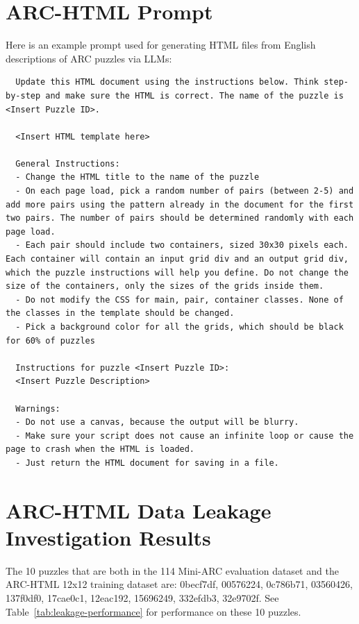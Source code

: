 \documentclass[10pt,twocolumn]{article}
\begin{document}
\section{ARC-HTML Prompt}
Here is an example prompt used for generating HTML files from English
descriptions of ARC puzzles via LLMs:

\begin{lstlisting}
  Update this HTML document using the instructions below. Think step-by-step and make sure the HTML is correct. The name of the puzzle is <Insert Puzzle ID>.

  <Insert HTML template here>

  General Instructions:
  - Change the HTML title to the name of the puzzle
  - On each page load, pick a random number of pairs (between 2-5) and add more pairs using the pattern already in the document for the first two pairs. The number of pairs should be determined randomly with each page load.
  - Each pair should include two containers, sized 30x30 pixels each. Each container will contain an input grid div and an output grid div, which the puzzle instructions will help you define. Do not change the size of the containers, only the sizes of the grids inside them.
  - Do not modify the CSS for main, pair, container classes. None of the classes in the template should be changed.
  - Pick a background color for all the grids, which should be black for 60% of puzzles

  Instructions for puzzle <Insert Puzzle ID>:
  <Insert Puzzle Description>

  Warnings:
  - Do not use a canvas, because the output will be blurry.
  - Make sure your script does not cause an infinite loop or cause the page to crash when the HTML is loaded.
  - Just return the HTML document for saving in a file.

\end{lstlisting}

\section{ARC-HTML Data Leakage Investigation Results}
\label{app:leakage-results}

The 10 puzzles that are both in the 114 Mini-ARC evaluation dataset
and the ARC-HTML 12x12 training dataset are: 0becf7df, 00576224,
0c786b71, 03560426, 137f0df0, 17cae0c1, 12eac192, 15696249, 332efdb3,
32e9702f. See Table~\ref{tab:leakage-performance} for performance on
these 10 puzzles.
\end{document}
